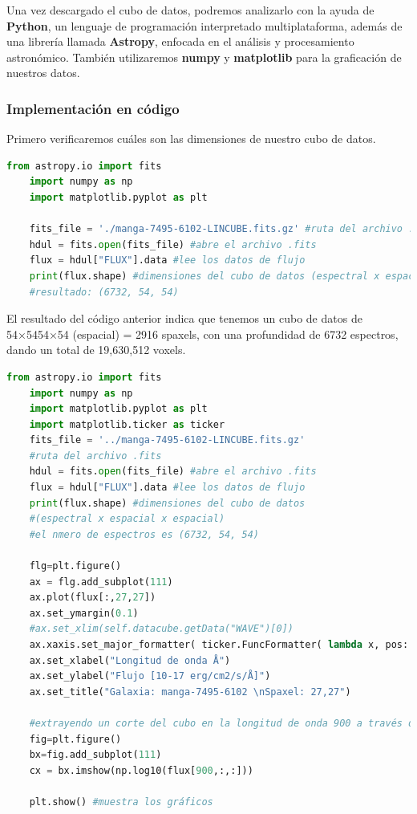 \documentclass[10pt,twocolumn,a4paper]{opticajnl}
\begin{document}
Una vez descargado el cubo de datos, podremos analizarlo con la ayuda de \textbf{Python}, un lenguaje de programación interpretado multiplataforma, además de una librería llamada \textbf{Astropy}, enfocada en el análisis y procesamiento astronómico. También utilizaremos \textbf{numpy} y \textbf{matplotlib} para la graficación de nuestros datos.

\subsubsection*{Implementación en código}

Primero verificaremos cuáles son las dimensiones de nuestro cubo de datos.

\begin{lstlisting}[language=Python]
    from astropy.io import fits
    import numpy as np
    import matplotlib.pyplot as plt
    
    fits_file = './manga-7495-6102-LINCUBE.fits.gz' #ruta del archivo .fits
    hdul = fits.open(fits_file) #abre el archivo .fits
    flux = hdul["FLUX"].data #lee los datos de flujo
    print(flux.shape) #dimensiones del cubo de datos (espectral x espacial x espacial)
    #resultado: (6732, 54, 54)
\end{lstlisting}

El resultado del código anterior indica que tenemos un cubo de datos de 54×5454×54 (espacial) = 2916 spaxels, con una profundidad de 6732 espectros, dando un total de 19,630,512 voxels.
\begin{lstlisting}[language=Python]
    from astropy.io import fits
    import numpy as np
    import matplotlib.pyplot as plt
    import matplotlib.ticker as ticker
    fits_file = '../manga-7495-6102-LINCUBE.fits.gz'
    #ruta del archivo .fits
    hdul = fits.open(fits_file) #abre el archivo .fits
    flux = hdul["FLUX"].data #lee los datos de flujo
    print(flux.shape) #dimensiones del cubo de datos
    #(espectral x espacial x espacial)
    #el nmero de espectros es (6732, 54, 54)
    
    flg=plt.figure()
    ax = flg.add_subplot(111)
    ax.plot(flux[:,27,27])
    ax.set_ymargin(0.1)
    #ax.set_xlim(self.datacube.getData("WAVE")[0])
    ax.xaxis.set_major_formatter( ticker.FuncFormatter( lambda x, pos: '{}{}'.format('', str(int(x)+self.datacube.getData("WAVE")[0]))))
    ax.set_xlabel("Longitud de onda Å")
    ax.set_ylabel("Flujo [10-17 erg/cm2/s/Å]")
    ax.set_title("Galaxia: manga-7495-6102 \nSpaxel: 27,27") 
    
    #extrayendo un corte del cubo en la longitud de onda 900 a través de toda la imagen y aplicando log10 - devuelve una imagen  
    fig=plt.figure()
    bx=fig.add_subplot(111) 
    cx = bx.imshow(np.log10(flux[900,:,:]))
    
    plt.show() #muestra los gráficos
\end{lstlisting}
\end{document}
